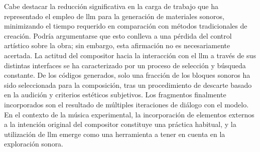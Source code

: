 Cabe destacar la reducción significativa en la carga de trabajo que ha representado el empleo de \gls{llm} para la generación de materiales sonoros, minimizando el tiempo requerido en comparación con métodos tradicionales de creación. Podría argumentarse que esto conlleva a una pérdida del control artístico sobre la obra; sin embargo, esta afirmación no es necesariamente acertada. La actitud del compositor hacia la interacción con el \gls{llm} a través de sus distintas interfaces se ha caracterizado por un proceso de selección y búsqueda constante. De los códigos generados, solo una fracción de los bloques sonoros ha sido seleccionada para la composición, tras un procedimiento de descarte basado en la audición y criterios estéticos subjetivos. Los fragmentos finalmente incorporados son el resultado de múltiples iteraciones de diálogo con el modelo. En el contexto de la música experimental, la incorporación de elementos externos a la intención original del compositor constituye una práctica habitual, y la utilización de \gls{llm} emerge como una herramienta a tener en cuenta en la exploración sonora.

